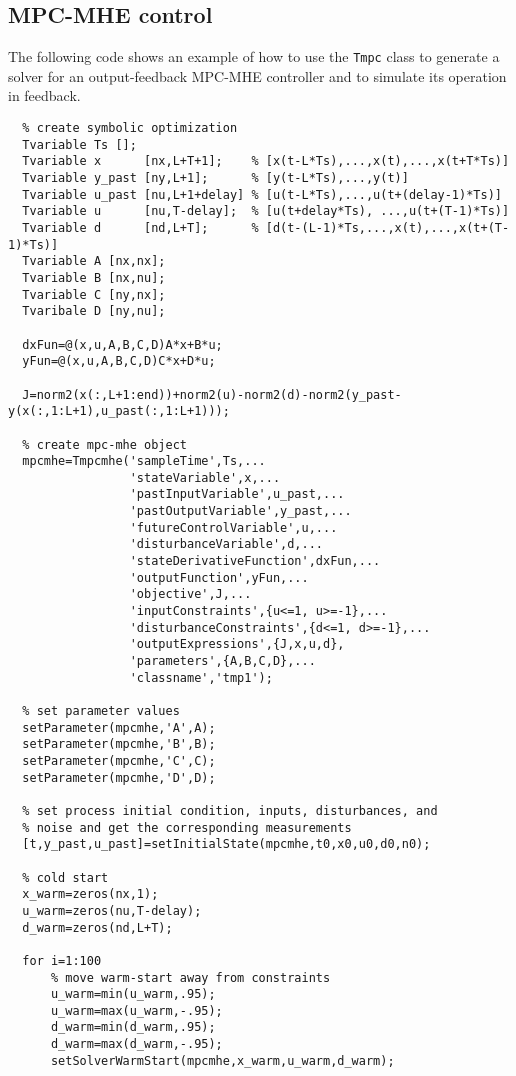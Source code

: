 \documentclass[11pt]{article}
\theoremstyle{remark}
\begin{document}
\subsection{MPC-MHE control}

The following code shows an example of how to use the \lstinline{Tmpc}
class to generate a solver for an output-feedback MPC-MHE controller
and to simulate its operation in feedback.
\begin{lstlisting}
  % create symbolic optimization
  Tvariable Ts [];
  Tvariable x      [nx,L+T+1];    % [x(t-L*Ts),...,x(t),...,x(t+T*Ts)]
  Tvariable y_past [ny,L+1];      % [y(t-L*Ts),...,y(t)]
  Tvariable u_past [nu,L+1+delay] % [u(t-L*Ts),...,u(t+(delay-1)*Ts)]
  Tvariable u      [nu,T-delay];  % [u(t+delay*Ts), ...,u(t+(T-1)*Ts)]
  Tvariable d      [nd,L+T];      % [d(t-(L-1)*Ts,...,x(t),...,x(t+(T-1)*Ts)]
  Tvariable A [nx,nx];
  Tvariable B [nx,nu];
  Tvariable C [ny,nx];
  Tvaribale D [ny,nu];
  
  dxFun=@(x,u,A,B,C,D)A*x+B*u;
  yFun=@(x,u,A,B,C,D)C*x+D*u;
  
  J=norm2(x(:,L+1:end))+norm2(u)-norm2(d)-norm2(y_past-y(x(:,1:L+1),u_past(:,1:L+1)));

  % create mpc-mhe object
  mpcmhe=Tmpcmhe('sampleTime',Ts,...
                 'stateVariable',x,...
                 'pastInputVariable',u_past,...
                 'pastOutputVariable',y_past,...
                 'futureControlVariable',u,...
                 'disturbanceVariable',d,...
                 'stateDerivativeFunction',dxFun,...
                 'outputFunction',yFun,...
                 'objective',J,...
                 'inputConstraints',{u<=1, u>=-1},...
                 'disturbanceConstraints',{d<=1, d>=-1},...
                 'outputExpressions',{J,x,u,d},
                 'parameters',{A,B,C,D},...
                 'classname','tmp1');

  % set parameter values
  setParameter(mpcmhe,'A',A);
  setParameter(mpcmhe,'B',B);
  setParameter(mpcmhe,'C',C);
  setParameter(mpcmhe,'D',D);
           
  % set process initial condition, inputs, disturbances, and
  % noise and get the corresponding measurements
  [t,y_past,u_past]=setInitialState(mpcmhe,t0,x0,u0,d0,n0);
  
  % cold start
  x_warm=zeros(nx,1);
  u_warm=zeros(nu,T-delay);
  d_warm=zeros(nd,L+T);

  for i=1:100
      % move warm-start away from constraints
      u_warm=min(u_warm,.95);
      u_warm=max(u_warm,-.95);
      d_warm=min(d_warm,.95);
      d_warm=max(d_warm,-.95);
      setSolverWarmStart(mpcmhe,x_warm,u_warm,d_warm);


\end{lstlisting}
\end{document}

